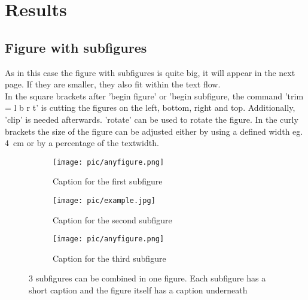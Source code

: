 \clearpage

\chapter{\textbf{Results}}\label{results}
\section{Figure with subfigures}\label{res:subfigure}
As in this case the figure with subfigures is quite big, it will appear in the next page. If they are smaller, they also fit within the text flow.\\
In the square brackets after 'begin figure' or 'begin subfigure, the command 'trim = l b r t' is cutting the figures on the left, bottom, right and top. Additionally, 'clip' is needed afterwards. 'rotate' can be used to rotate the figure. In the curly brackets the size of the figure can be adjusted either by using a defined width eg. 4~cm or by a percentage of the textwidth.
\begin{figure}[p]
    \centering %
\begin{subfigure}{0.75\textwidth}
  \texttt{[image: pic/anyfigure.png]}
  \caption{Caption for the first subfigure}
  \label{fig:1}
\end{subfigure}\hfil %
\begin{subfigure}{7 cm}
  \texttt{[image: pic/example.jpg]}
  \caption{Caption for the second subfigure}
  \label{fig:2}
\end{subfigure}\hfil %

\medskip
\begin{subfigure}{0.75\textwidth}
  \texttt{[image: pic/anyfigure.png]}
  \caption{Caption for the third subfigure}
  \label{fig:3}
\end{subfigure}\hfil %

\caption[Figure with multiple subfigures]{3 subfigures can be combined in one figure. Each subfigure has a short caption and the figure itself has a caption underneath}
\label{fig:FACS-diff-comparison}
\end{figure}


